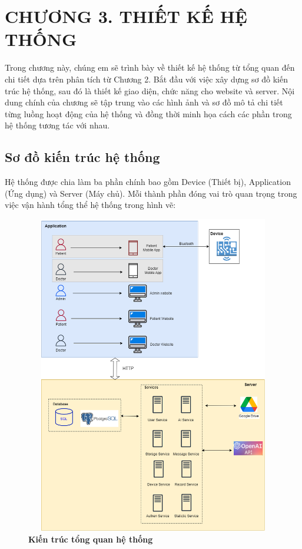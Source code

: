 
\section*{CHƯƠNG 3. THIẾT KẾ HỆ THỐNG}
\setcounter{section}{3}
\setcounter{subsection}{0} %
\setcounter{table}{0} %
\setcounter{figure}{0} %

Trong chương này, chúng em sẽ trình bày về thiết kế hệ thống từ tổng quan đến chi tiết dựa trên phân tích từ Chương 2. Bắt đầu với việc xây dựng sơ đồ kiến trúc hệ thống,
sau đó là thiết kế giao diện, chức năng cho website và server. Nội dung chính của chương sẽ tập trung vào các hình
ảnh và sơ đồ mô tả chi tiết từng luồng hoạt động của hệ thống và đồng thời minh họa cách các phần trong hệ thống tương tác với nhau.

\subsection{Sơ đồ kiến trúc hệ thống}
Hệ thống được chia làm ba phần chính bao gồm Device (Thiết bị), Application (Ứng dụng) và Server (Máy chủ). Mỗi thành phần đóng vai trò quan trọng trong việc vận hành tổng thể hệ thống trong hình vẽ:

\begin{figure}[H]
  \centering
  \includegraphics[width=12cm,height=14cm]{Images/system/fmECG_architecture-System_Architecture.png}
  \caption[Kiến trúc tổng quan hệ thống]{\bfseries \fontsize{12pt}{0pt}\selectfont Kiến trúc tổng quan hệ thống}
  \label{fmECG_architecture-System} %
\end{figure}


